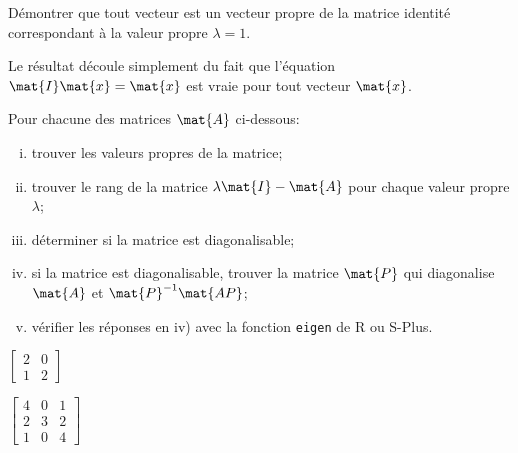 \begin{exercice}
  Démontrer que tout vecteur est un vecteur propre de la matrice
  identité correspondant à la valeur propre $\lambda = 1$.
  \begin{sol}
    Le résultat découle simplement du fait que l'équation $\mat{I}
    \mat{x} = \mat{x}$ est vraie pour tout vecteur $\mat{x}$.
  \end{sol}
\end{exercice}

\begin{exercice}
  Pour chacune des matrices $\mat{A}$ ci-dessous:
  \begin{enumerate}[i)]
  \item trouver les valeurs propres de la matrice;
  \item trouver le rang de la matrice $\lambda \mat{I} - \mat{A}$ pour
    chaque valeur propre $\lambda$;
  \item déterminer si la matrice est diagonalisable;
  \item si la matrice est diagonalisable, trouver la matrice $\mat{P}$
    qui diagonalise $\mat{A}$ et $\mat{P}^{-1} \mat{AP}$;
  \item vérifier les réponses en iv) avec la fonction \texttt{eigen}
    de \textsf{R} ou S-Plus.
  \end{enumerate}
  \begin{enumerate}
    \begin{multicols}{2}
    \item $\begin{bmatrix} 2 & 0 \\ 1 & 2 \end{bmatrix}$
    \item $\begin{bmatrix}
        4 &  0 &  1 \\
        2 &  3 &  2 \\
        1 & 0 & 4
      \end{bmatrix}$
    \end{multicols}
\end{enumerate}
\end{exercice}
